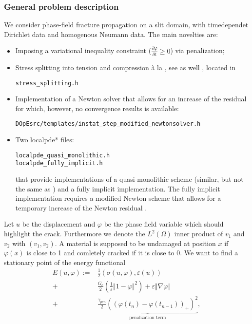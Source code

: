 \subsubsection{General problem description}
We consider phase-field fracture propagation on a slit domain, with timedependet 
Dirichlet data and homogenous Neumann data.
The main novelties are:
\begin{itemize}
\item Imposing a variational inequality constraint ($\frac{\partial \varphi}{\partial t} \ge 0$)
via penalization;
\item Stress splitting into tension and compression \`a
la \cite{MieWelHof10a}, see as well \cite{AmorMarigoMaurini2009}, located 
in 
\begin{verbatim}
stress_splitting.h
\end{verbatim}
\item Implementation of a Newton solver that 
allows for an increase of the residual for which, however,
no convergence results is available:
\begin{verbatim}
DOpEsrc/templates/instat_step_modified_newtonsolver.h
\end{verbatim}
\item Two localpde* files:
\begin{verbatim}
localpde_quasi_monolithic.h
localpde_fully_implicit.h
\end{verbatim}
that provide implementations of a quasi-monolithic scheme (similar, but not
the same as \cite{HeWheWi15}) and a fully implicit implementation.
The fully implicit implementation requires a modified Newton scheme that 
allows for a temporary increase of the Newton residual \cite{Wi17_pff_error_oriented_Newton}.
\end{itemize}
Let $u$ be the displacement and $\varphi$ be the phase field variable which should highlight the crack.
Furthermore we denote the $L^2(\Omega)$ inner product of $v_1$ and $v_2$ with $(v_1,v_2)$.
A material is supposed to be undamaged at position $x$ if $\varphi(x)$ is close to 1 and comletely cracked
if it is close to $0$.
We want to find a stationary point of the energy functional
\begin{align*}
E(u, \varphi):=& \frac{1}{2}(\sigma(u,\varphi),\varepsilon(u)) \\
+&\frac{G_c}{2}(\frac{1}{\varepsilon} \Vert 1 - \varphi \Vert^2)+\varepsilon \Vert \nabla \varphi  \Vert\\
+&\underbrace{\frac{\gamma_{pen}}{2} ((\varphi(t_n)-\varphi(t_{n-1}))_+)^2}_{\text{penalization term}},
\end{align*}
